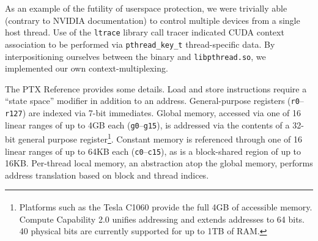 \documentclass[letterpaper,10pt]{article}
\begin{document}
\begin{multicols}{2}
As an example of the futility of userspace protection, we were trivially able
(contrary to NVIDIA documentation) to control multiple devices from a single
host thread. Use of the \texttt{ltrace} library call tracer indicated CUDA
context association to be performed via \texttt{pthread\_key\_t} thread-specific
data. By interpositioning ourselves between the binary and \texttt{libpthread.so},
we implemented our own context-multiplexing.

The PTX Reference provides some details. Load and store instructions require a ``state space''
modifier in addition to an address. General-purpose registers (\texttt{r0}--\texttt{r127}) are
indexed via 7-bit immediates. Global memory, accessed via one of 16 linear ranges
of up to 4GB each (\texttt{g0}--\texttt{g15}), is addressed via the
contents of a 32-bit general purpose register\footnote{Platforms such as the Tesla\textsuperscript{\texttrademark} C1060 provide the
full 4GB of accessible memory. Compute Capability 2.0 unifies addressing
and extends addresses to 64 bits. 40 physical bits are currently
supported for up to 1TB of RAM.}. Constant memory is referenced through one of 16 linear ranges of up to
64KB each (\texttt{c0}--\texttt{c15}), as is a block-shared region of up to 16KB.
Per-thread local memory, an abstraction atop the global memory, performs
address translation based on block and thread indices.

\end{multicols}
\end{document}
